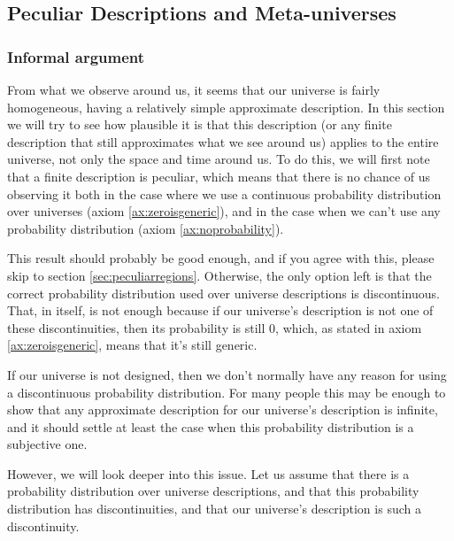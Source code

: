 \documentclass[a4paper
,draft
]{article}
\begin{document}
\subsection{Peculiar Descriptions and Meta-universes}
\label{fdaumu}

\subsubsection{Informal argument}

From what we observe around us, it seems that our universe is fairly homogeneous,
having a relatively simple approximate description.
In this section we will try to see how plausible it is that this description
(or any finite description that still approximates what we see around us)
applies to the entire universe, not only the space and time around us.
To do this, we will first note that a finite description is peculiar,
which means that there is no chance of
us observing it both in the case where we use a continuous probability
distribution over universes (axiom \ref{ax:zeroisgeneric}),
and in the case when we can't use any probability
distribution (axiom \ref{ax:noprobability}).

This result should probably be good enough, and if you agree with
this, please skip to section \ref{sec:peculiarregions}.
Otherwise, the only option left is that the correct probability
distribution used over universe descriptions is discontinuous.
That, in itself, is not enough because if our universe's description is not
one of these discontinuities, then its probability is still $0$, which,
as stated in axiom \ref{ax:zeroisgeneric}, means that it's still generic.

If our universe is not designed, then we don't normally have any
reason for using a discontinuous probability distribution.
For many people this may be enough to
show that any approximate description for our universe's description is
infinite, and it should settle at least the case when this probability
distribution is a subjective one.

However, we will look deeper into this issue.
Let us assume that there is a probability distribution over universe
descriptions, and that this probability distribution has discontinuities,
and that our universe's description is such a discontinuity.
\end{document}

